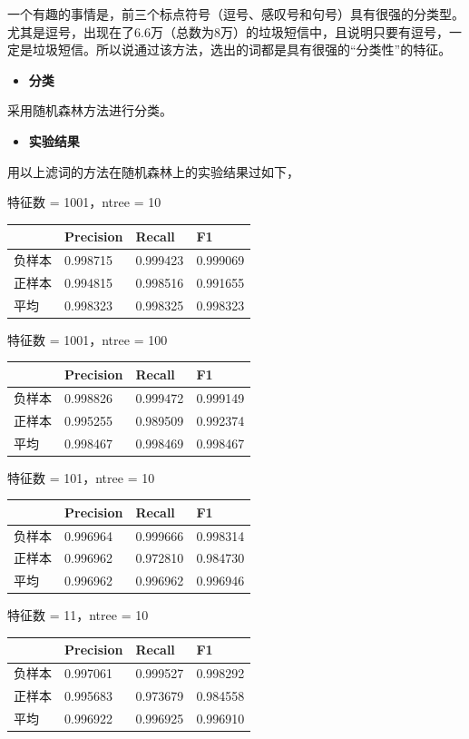 \documentclass{article}
\begin{document}
一个有趣的事情是，前三个标点符号（逗号、感叹号和句号）具有很强的分类型。尤其是逗号，出现在了6.6万（总数为8万）的垃圾短信中，且说明只要有逗号，一定是垃圾短信。所以说通过该方法，选出的词都是具有很强的``分类性''的特征。

\begin{itemize}
\tightlist
\item
  \textbf{分类}
\end{itemize}

采用随机森林方法进行分类。

\begin{itemize}
\tightlist
\item
  \textbf{实验结果}
\end{itemize}

用以上滤词的方法在随机森林上的实验结果过如下，

特征数 = 1001，ntree = 10

\begin{longtable}[]{@{}llll@{}}
\toprule
& Precision & Recall & F1\tabularnewline
\midrule
\endhead
负样本 & 0.998715 & 0.999423 & 0.999069\tabularnewline
正样本 & 0.994815 & 0.998516 & 0.991655\tabularnewline
平均 & 0.998323 & 0.998325 & 0.998323\tabularnewline
\bottomrule
\end{longtable}

特征数 = 1001，ntree = 100

\begin{longtable}[]{@{}llll@{}}
\toprule
& Precision & Recall & F1\tabularnewline
\midrule
\endhead
负样本 & 0.998826 & 0.999472 & 0.999149\tabularnewline
正样本 & 0.995255 & 0.989509 & 0.992374\tabularnewline
平均 & 0.998467 & 0.998469 & 0.998467\tabularnewline
\bottomrule
\end{longtable}

特征数 = 101，ntree = 10

\begin{longtable}[]{@{}llll@{}}
\toprule
& Precision & Recall & F1\tabularnewline
\midrule
\endhead
负样本 & 0.996964 & 0.999666 & 0.998314\tabularnewline
正样本 & 0.996962 & 0.972810 & 0.984730\tabularnewline
平均 & 0.996962 & 0.996962 & 0.996946\tabularnewline
\bottomrule
\end{longtable}

特征数 = 11，ntree = 10

\begin{longtable}[]{@{}llll@{}}
\toprule
& Precision & Recall & F1\tabularnewline
\midrule
\endhead
负样本 & 0.997061 & 0.999527 & 0.998292\tabularnewline
正样本 & 0.995683 & 0.973679 & 0.984558\tabularnewline
平均 & 0.996922 & 0.996925 & 0.996910\tabularnewline
\bottomrule
\end{longtable}
\end{document}
